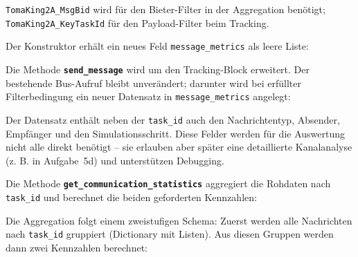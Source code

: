 

\texttt{TomaKing2A\_MsgBid} wird für den Bieter-Filter in der Aggregation benötigt; \texttt{TomaKing2A\_KeyTaskId} für den Payload-Filter beim Tracking.

Der Konstruktor erhält ein neues Feld \texttt{message\_metrics} als leere Liste:




Die Methode \textbf{\texttt{send\_message}} wird um den Tracking-Block erweitert. Der bestehende Bus-Aufruf bleibt unverändert; darunter wird bei erfüllter Filterbedingung ein neuer Datensatz in \texttt{message\_metrics} angelegt:



Der Datensatz enthält neben der \texttt{task\_id} auch den Nachrichtentyp, Absender, Empfänger und den Simulationsschritt. Diese Felder werden für die Auswertung nicht alle direkt benötigt -- sie erlauben aber später eine detaillierte Kanalanalyse (z. B. in Aufgabe~5d) und unterstützen Debugging.


Die Methode \textbf{\texttt{get\_communication\_statistics}} aggregiert die Rohdaten nach \texttt{task\_id} und berechnet die beiden geforderten Kennzahlen:



Die Aggregation folgt einem zweistufigen Schema: Zuerst werden alle Nachrichten nach \texttt{task\_id} gruppiert (Dictionary mit Listen). Aus diesen Gruppen werden dann zwei Kennzahlen berechnet:

